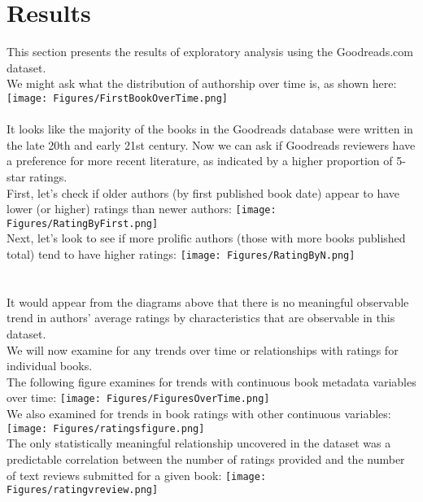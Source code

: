 \documentclass{article}
\begin{document}
\section{Results}
This section presents the results of exploratory analysis using the Goodreads.com dataset.
\\
We might ask what the distribution of authorship over time is, as shown here:
\\
\texttt{[image: Figures/FirstBookOverTime.png]}\\
\\It looks like the majority of the books in the Goodreads database were written in the late 20th and early 21st century.
Now we can ask if Goodreads reviewers have a preference for more recent literature, as indicated by a higher proportion of 5-star ratings.
\\First, let's check if older authors (by first published book date) appear to have lower (or higher) ratings than newer authors:
\texttt{[image: Figures/RatingByFirst.png]}\\
Next, let's look to see if more prolific authors (those with more books published total) tend to have higher ratings:
\texttt{[image: Figures/RatingByN.png]}\\
\\
\\It would appear from the diagrams above that there is no meaningful observable trend in authors' average ratings by characteristics that are observable in this dataset.
\\ We will now examine for any trends over time or relationships with ratings for individual books.
\\ The following figure examines for trends with continuous book metadata variables over time:
\texttt{[image: Figures/FiguresOverTime.png]}
\\ We also examined for trends in book ratings with other continuous variables:
\texttt{[image: Figures/ratingsfigure.png]}
\\ The only statistically meaningful relationship uncovered in the dataset was a predictable correlation between the number of ratings provided and the number of text reviews submitted for a given book:
\texttt{[image: Figures/ratingvreview.png]}
\end{document}

